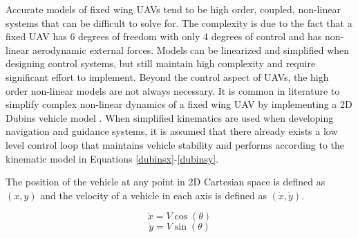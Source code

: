 \documentclass[numbered,pdftex]{ohio-etd}
\begin{document}
Accurate models of fixed wing UAVs tend to be high order, coupled, non-linear systems that can be difficult to solve for. The complexity is due to the fact that a fixed UAV has 6 degrees of freedom with only 4 degrees of control and has non-linear aerodynamic external forces. Models can be linearized and simplified when designing control systems, but still maintain high complexity and require significant effort to implement. Beyond the control aspect of UAVs, the high order non-linear models are not always necessary. It is common in literature to simplify complex non-linear dynamics of a fixed wing UAV by implementing a 2D Dubins vehicle model \cite{chen_tracking_2009} \cite{liang_tangent_2017} \cite{nelson_cooperative_2005} \cite{griffiths_vector_2006} \cite{jung_unmanned_2016}. When simplified kinematics are used when developing navigation and guidance systems, it is assumed that there already exists a low level control loop that maintains vehicle stability and performs according to the kinematic model in Equations \ref{dubinsx}-\ref{dubinsy}.






The position of the vehicle at any point in 2D Cartesian space is defined as $(x,y)$ and the velocity of a vehicle in each axis is defined as $(\dot{x},\dot{y})$.

\begin{equation}
\label{dubinsx}
\dot{x} = V\cos(\theta)
\end{equation}
\begin{equation}
\label{dubinsy}
\dot{y} = V\sin(\theta)
\end{equation}
\end{document}
